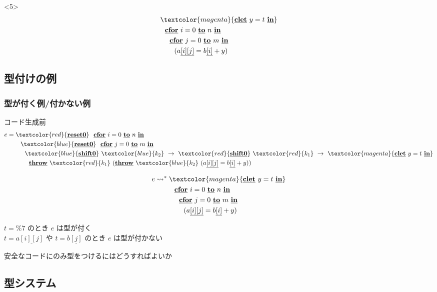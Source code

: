 \documentclass[dvipdfmx,cjk,xcolor=dvipsnames,envcountsect,notheorems,12pt]{beamer}
\newcommand\cResetz{\underline{\textbf{reset0}}}
\newcommand\cShiftz{\underline{\textbf{shift0}}}
\newcommand\cThrow{\underline{\textbf{throw}}}
\newcommand\cLet{\underline{\textbf{clet}}}
\newcommand\cIn{\underline{\textbf{in}}}
\newcommand\csp[1]{\texttt{\%}{#1}}
\newcommand\too{\leadsto^*}
\newcommand\red[1]{\textcolor{red}{#1}}
\newcommand\magenta[1]{\textcolor{magenta}{#1}}
\newcommand\blue[1]{\textcolor{blue}{#1}}
\newcommand\cforin[2]{\underline{\textbf{cfor}}~{#1}~\underline{\textbf{to}}~{#2}~\underline{\textbf{in}}}
\newcommand\cArray[1]{\underline{[{#1}]}}
\newcommand\cArrays[2]{\underline{[{#1}][{#2}]}}
\theoremstyle{definition}
\begin{document}
\begin{frame}
  \begin{onlyenv}<5>
    \begin{align*}
      & \magenta{\cLet~y=t~\cIn} \\
      & ~~\cforin{i = 0}{n} \\
      & ~~~~\cforin{j = 0}{m} \\
      & ~~~~~~(a\cArrays{i}{j} = b\cArray{i} + y)
    \end{align*}
  \end{onlyenv}
\end{frame}

\subsection{型付けの例}

\begin{frame}
  \frametitle{型が付く例/付かない例}
  コード生成前
  \begin{align*}
    e & = \red{\cResetz} ~~\cforin{i = 0}{n} \\
      & \phantom{=}~~~~\blue{\cResetz} ~~\cforin{j = 0}{m} \\
      & \phantom{=}~~~~~~ \blue{\cShiftz}~\blue{k_2}~\to~ \red{\cShiftz}~\red{k_1}~\to~ \magenta{\cLet~y=t~\cIn} \\
      & \phantom{=}~~~~~~~~ \cThrow~\red{k_1}~(\cThrow~\blue{k_2}~(a\cArrays{i}{j} = b\cArray{i} + y))
  \end{align*}

  \pause

  \begin{align*}
    e & \too \magenta{\cLet~y=t~\cIn} \\
      & \phantom{\too}~~~~\cforin{i = 0}{n} \\
      & \phantom{\too}~~~~~~\cforin{j = 0}{m} \\
      & \phantom{\too}~~~~~~~~(a\cArrays{i}{j} = b\cArray{i} + y)
  \end{align*}

  \pause
  $t=\csp{7}$ のとき $e$ は型が付く\\
  $t=a\cArrays{i}{j}$ や $t=b\cArray{j}$ のとき $e$ は型が付かない
\end{frame}

\begin{frame}
  \center
  \huge{安全なコードにのみ型をつけるにはどうすればよいか}
\end{frame}

\subsection{型システム}
\end{document}
